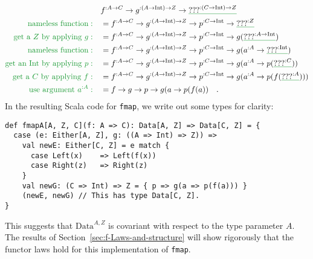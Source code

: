 \begin{align*}
 & f^{:A\rightarrow C}\rightarrow g^{:\left(A\rightarrow\text{Int}\right)\rightarrow Z}\rightarrow\gunderline{\text{???}^{:\left(C\rightarrow\text{Int}\right)\rightarrow Z}}\\
{\color{greenunder}\text{nameless function}:}\quad & =f^{:A\rightarrow C}\rightarrow g^{:\left(A\rightarrow\text{Int}\right)\rightarrow Z}\rightarrow p^{:C\rightarrow\text{Int}}\rightarrow\gunderline{\text{???}^{:Z}}\\
{\color{greenunder}\text{get a }Z\text{ by applying }g:}\quad & =f^{:A\rightarrow C}\rightarrow g^{:\left(A\rightarrow\text{Int}\right)\rightarrow Z}\rightarrow p^{:C\rightarrow\text{Int}}\rightarrow g(\gunderline{\text{???}^{:A\rightarrow\text{Int}}})\\
{\color{greenunder}\text{nameless function}:}\quad & =f^{:A\rightarrow C}\rightarrow g^{:\left(A\rightarrow\text{Int}\right)\rightarrow Z}\rightarrow p^{:C\rightarrow\text{Int}}\rightarrow g(a^{:A}\rightarrow\gunderline{\text{???}^{:\text{Int}}})\\
{\color{greenunder}\text{get an Int by applying }p:}\quad & =f^{:A\rightarrow C}\rightarrow g^{:\left(A\rightarrow\text{Int}\right)\rightarrow Z}\rightarrow p^{:C\rightarrow\text{Int}}\rightarrow g(a^{:A}\rightarrow p(\gunderline{\text{???}^{:C}}))\\
{\color{greenunder}\text{get a }C\text{ by applying }f:}\quad & =f^{:A\rightarrow C}\rightarrow g^{:\left(A\rightarrow\text{Int}\right)\rightarrow Z}\rightarrow p^{:C\rightarrow\text{Int}}\rightarrow g(a^{:A}\rightarrow p(f(\gunderline{\text{???}^{:A}})))\\
{\color{greenunder}\text{use argument }a^{:A}:}\quad & =f\rightarrow g\rightarrow p\rightarrow g(a\rightarrow p(f(a))\quad.
\end{align*}
In the resulting Scala code for \lstinline!fmap!, we write out some
types for clarity:
\begin{lstlisting}
def fmapA[A, Z, C](f: A => C): Data[A, Z] => Data[C, Z] = {
  case (e: Either[A, Z], g: ((A => Int) => Z)) =>
    val newE: Either[C, Z] = e match {
      case Left(x)    => Left(f(x))
      case Right(z)   => Right(z)
    }
    val newG: (C => Int) => Z = { p => g(a => p(f(a))) }
    (newE, newG) // This has type Data[C, Z].
}
\end{lstlisting}
This suggests that $\text{Data}^{A,Z}$ is covariant with respect
to the type parameter $A$. The results of Section~\ref{sec:f-Laws-and-structure}
will show rigorously that the functor laws hold for this implementation
of \lstinline!fmap!.


